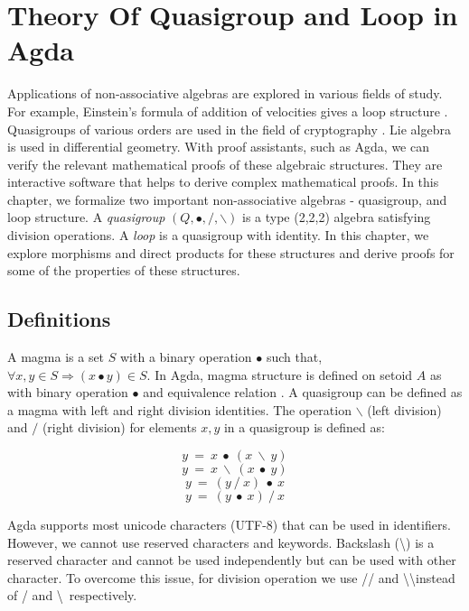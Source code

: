 \chapter{Theory Of Quasigroup and Loop in Agda}
Applications of non-associative algebras are explored in various fields of
study. For example, Einstein's formula of addition of velocities gives a loop
structure \cite{ungar2007einstein}. Quasigroups of various orders are used in
the field of cryptography \cite{phillips2010automated}. Lie algebra is used in
differential geometry\cite{quasigroupWiki}. With proof assistants, such as Agda,
we can verify the relevant mathematical proofs of these algebraic structures.
They are interactive software that helps to derive complex mathematical proofs.
In this chapter, we formalize two important non-associative algebras -
quasigroup, and loop structure. A \textit{quasigroup} $(Q, ∙, /, \backslash)$ is
a type (2,2,2) algebra satisfying division operations. A \textit{loop} is a
quasigroup with identity. In this chapter, we explore morphisms and direct
products for these structures and derive proofs for some of the properties of
these structures.
\section{Definitions}
A magma is a set $S$ with a binary operation $∙$ such that, $\forall x,y \in S
\Rightarrow (x ∙ y) \in S$. In Agda, magma structure is defined on setoid $A$ as
 with binary operation $∙$ and equivalence relation . A
quasigroup can be defined as a magma with left and right division identities.
The operation $\backslash$ (left division) and $/$ (right division) for elements
$x,y$ in a quasigroup is defined as:

\begin{equation} \label{eq_L-leftdivides}
y\ =\ x\ ∙\ (x\ \backslash\ y)
\end{equation}
\begin{equation} \label{eq_L-rightdivides}
y\ =\ x\ \backslash\ (x\ ∙\ y)
\end{equation}
\begin{equation} \label{eq_R-leftdivides}
y\ =\ (y\ /\ x)\ ∙\ x
\end{equation}
\begin{equation} \label{eq_Rirightdivides}
y\ =\ (y\ ∙\ x)\ /\ x
\end{equation}

Agda supports most unicode characters (UTF-8) that can be used in identifiers.
However, we cannot use reserved characters and keywords. Backslash
(\textbackslash) is a reserved character and cannot be used independently but
can be used with other character. To overcome this issue, for division operation
we use // and \textbackslash\textbackslash instead of / and \textbackslash \
respectively.


